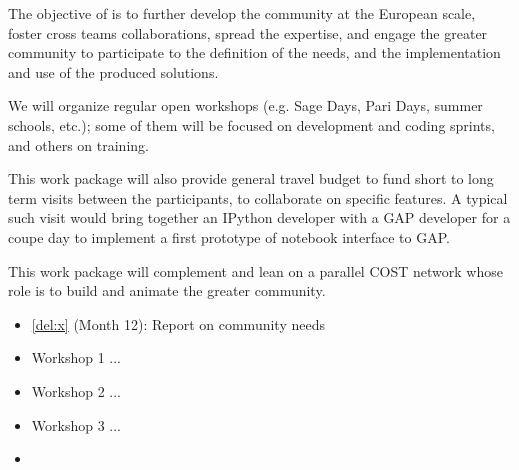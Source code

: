 \addtocounter{wpno}{1}
\begin{Workpackage}{\thewpno}
\WPTitle{\wpname{\thewpno}}

\begin{WPObjectives}
  The objective of \theWP{} is to further develop the community at the
  European scale, foster cross teams collaborations, spread the
  expertise, and engage the greater community to participate to the
  definition of the needs, and the implementation and use of the
  produced solutions.
\end{WPObjectives}

\begin{WPDescription}
  We will organize regular open workshops (e.g. Sage Days, Pari Days,
  summer schools, etc.); some of them will be focused on development
  and coding sprints, and others on training.

  This work package will also provide general travel budget to fund
  short to long term visits between the participants, to collaborate
  on specific features. A typical such visit would bring together an
  IPython developer with a GAP developer for a coupe day to implement
  a first prototype of notebook interface to GAP.

  This work package will complement and lean on a parallel COST
  network whose role is to build and animate the greater community.
\end{WPDescription}

\begin{WPDeliverables}
\begin{itemize}
\item
\ref{del:x}
(Month 12): Report on community needs
\item Workshop 1 ...
\item Workshop 2 ...
\item Workshop 3 ...
\item {}
\end{itemize}
\end{WPDeliverables}
\end{Workpackage}
